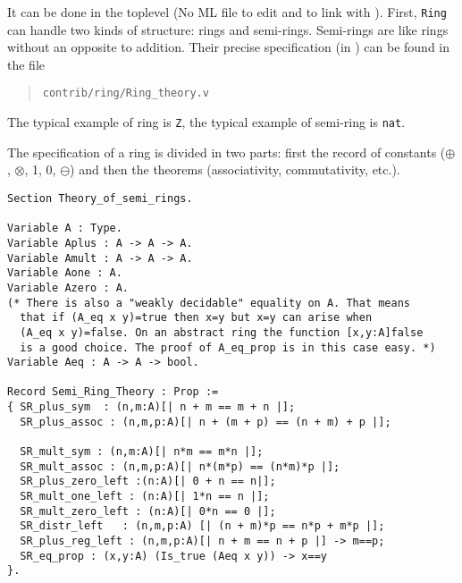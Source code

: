 
It can be done in the \Coq toplevel (No ML file to edit and to link
with \Coq). First, \texttt{Ring} can handle two kinds of structure:
rings and semi-rings. Semi-rings are like rings without an opposite to
addition. Their precise specification (in \gallina) can be found in
the file

\begin{quotation}
\begin{verbatim}
contrib/ring/Ring_theory.v
\end{verbatim}
\end{quotation}

The typical example of ring is \texttt{Z}, the typical
example of semi-ring is \texttt{nat}.

The specification of a
ring is divided in two parts: first the record of constants
($\oplus$, $\otimes$, 1, 0, $\ominus$) and then the theorems
(associativity, commutativity, etc.).

\begin{small}
\begin{flushleft}
\begin{verbatim}
Section Theory_of_semi_rings.

Variable A : Type.
Variable Aplus : A -> A -> A.
Variable Amult : A -> A -> A.
Variable Aone : A.
Variable Azero : A.
(* There is also a "weakly decidable" equality on A. That means 
  that if (A_eq x y)=true then x=y but x=y can arise when 
  (A_eq x y)=false. On an abstract ring the function [x,y:A]false
  is a good choice. The proof of A_eq_prop is in this case easy. *)
Variable Aeq : A -> A -> bool.

Record Semi_Ring_Theory : Prop :=
{ SR_plus_sym  : (n,m:A)[| n + m == m + n |];
  SR_plus_assoc : (n,m,p:A)[| n + (m + p) == (n + m) + p |];

  SR_mult_sym : (n,m:A)[| n*m == m*n |];
  SR_mult_assoc : (n,m,p:A)[| n*(m*p) == (n*m)*p |];
  SR_plus_zero_left :(n:A)[| 0 + n == n|];
  SR_mult_one_left : (n:A)[| 1*n == n |];
  SR_mult_zero_left : (n:A)[| 0*n == 0 |];
  SR_distr_left   : (n,m,p:A) [| (n + m)*p == n*p + m*p |];
  SR_plus_reg_left : (n,m,p:A)[| n + m == n + p |] -> m==p;
  SR_eq_prop : (x,y:A) (Is_true (Aeq x y)) -> x==y
}.
\end{verbatim}
\end{flushleft}
\end{small}


